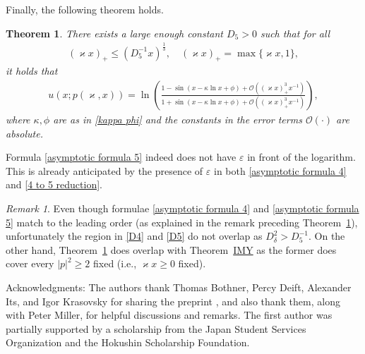 \documentclass[a4paper,10pt,leqno]{amsart}
\numberwithin{equation}{subsection}
\theoremstyle{plain}
\newtheorem{thm}{Theorem}[section]
\theoremstyle{definition}
\theoremstyle{remark}
\newtheorem*{rem}{Remark}
\theoremstyle{case}
\renewcommand{\O}{\mathcal{O}}
\begin{document}
Finally, the following theorem holds.

\begin{tcolorbox}[colback=white,colframe=gray]
\begin{thm}
\label{thm:5}
There exists a large enough constant \( D_5>0 \) such that for all 
\begin{align}
\label{D5}
(\varkappa x)_+ \leq \left(D_5^{-1} x\right)^{\frac13}, \quad (\varkappa x)_+ = \max\{\varkappa x,1\},
\end{align}
it holds that 
\begin{align}
\label{asymptotic formula 5}
u(x;p(\varkappa,x)) = \ln \left(\frac{1 - \sin \left( x - \kappa\ln x + \phi \right)+\O((\varkappa x)_+^3x^{-1})}{1 + \sin \left( x - \kappa\ln x + \phi \right)+\O((\varkappa x)_+^3x^{-1})} \right), 
\end{align}
where \( \kappa,\phi \) are as in \eqref{kappa phi} and the constants in the error terms \( \O(\cdot) \) are absolute.
\end{thm}
\end{tcolorbox}

Formula \eqref{asymptotic formula 5} indeed does not have \( \varepsilon\) in front of the logarithm. This is already anticipated by the presence of \( \varepsilon \) in both \eqref{asymptotic formula 4} and \eqref{4 to 5 reduction}.


\begin{tcolorbox}[colback=white,colframe=gray]
\begin{rem}
Even though formulae \eqref{asymptotic formula 4} and \eqref{asymptotic formula 5} match to the leading order (as explained in the remark preceding Theorem~\ref{thm:5}), unfortunately the region in \eqref{D4} and \eqref{D5} do not overlap as \( D_\delta^2>D_5^{-1} \). On the other hand, Theorem~\ref{thm:5} does overlap with Theorem~\hyperref[IMY main thm]{IMY} as the former does cover every \( |p|^2 \geq 2 \) fixed (i.e., \( \varkappa x\geq0 \) fixed).
\end{rem}
\end{tcolorbox}



Acknowledgments: The authors thank Thomas Bothner, Percy Deift, Alexander Its, and Igor Krasovsky for sharing the preprint \cite{BDIK4}, and also thank them, along with Peter Miller, for helpful discussions and remarks. The first author was partially supported by a scholarship from the Japan Student Services Organization and the Hokushin Scholarship Foundation.
\end{document}
